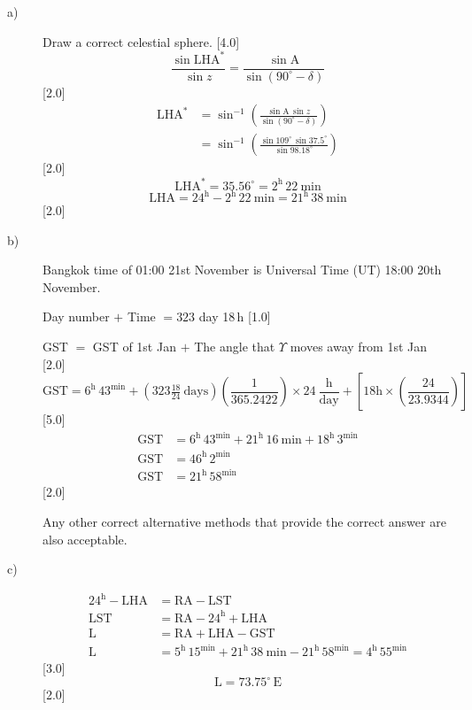 \begin{description}
\item[a)] Draw a correct celestial sphere. \hfill[4.0]
  \[ \frac{\sin\mathrm{LHA}^{*}}{\sin z}
     = \frac{\sin\mathrm{A}}{\sin(90^\circ - \delta)} \]
  \hfill[2.0]
  \begin{align*}
  \mathrm{LHA}^{*} &= \sin^{-1}\left(
    \frac{\sin\mathrm{A}\,\sin z}{\sin(90^\circ - \delta)}\right)\\
  &= \sin^{-1}\left(
    \frac{\sin 109^\circ\,\sin 37.5^\circ}{\sin 98.18^\circ}\right)
  \end{align*}
  \hfill[2.0]
  \[ \mathrm{LHA}^{*} = 35.56^\circ = 2^{\mathrm{h}}\,22\ \mathrm{min} \]
  \[ \mathrm{LHA} = 24^{\mathrm{h}} - 2^{\mathrm{h}}\,22\ \mathrm{min}
     = 21^{\mathrm{h}}\,38\ \mathrm{min} \]
  \hfill[2.0]

\item[b)] Bangkok time of 01:00 21st November is Universal Time (UT) 18:00
  20th November.

  Day number $+$ Time $= 323$ day 18\,h \hfill[1.0]

  GST $=$ GST of 1st Jan $+$ The angle that $\Upsilon$ moves away from 1st
  Jan \hfill[2.0]
  \[ \mathrm{GST} = 6^{\mathrm{h}}\,43^{\mathrm{min}}
     + \left(323\tfrac{18}{24}\ \mathrm{days}\right)
       \left(\frac{1}{365.2422}\right)\times 24\ \frac{\mathrm{h}}{\mathrm{day}}
     + \left[18\mathrm{h}\times\left(\frac{24}{23.9344}\right)\right] \]
  \hfill[5.0]
  \begin{align*}
  \mathrm{GST} &= 6^{\mathrm{h}}\,43^{\mathrm{min}}
    + 21^{\mathrm{h}}\,16\ \mathrm{min} + 18^{\mathrm{h}}\,3^{\mathrm{min}}\\
  \mathrm{GST} &= 46^{\mathrm{h}}\,2^{\mathrm{min}}\\
  \mathrm{GST} &= 21^{\mathrm{h}}\,58^{\mathrm{min}}
  \end{align*}
  \hfill[2.0]

  Any other correct alternative methods that provide the correct answer are
  also acceptable.

\item[c)]
  \begin{align*}
  24^{\mathrm{h}} - \mathrm{LHA} &= \mathrm{RA} - \mathrm{LST}\\
  \mathrm{LST} &= \mathrm{RA} - 24^{\mathrm{h}} + \mathrm{LHA}\\
  \mathrm{L} &= \mathrm{RA} + \mathrm{LHA} - \mathrm{GST}\\
  \mathrm{L} &= 5^{\mathrm{h}}\,15^{\mathrm{min}}
    + 21^{\mathrm{h}}\,38\ \mathrm{min} - 21^{\mathrm{h}}\,58^{\mathrm{min}}
    = 4^{\mathrm{h}}\,55^{\mathrm{min}}
  \end{align*}
  \hfill[3.0]
  \[ \mathrm{L} = 73.75^\circ\,\mathrm{E} \]
  \hfill[2.0]


\end{description}
